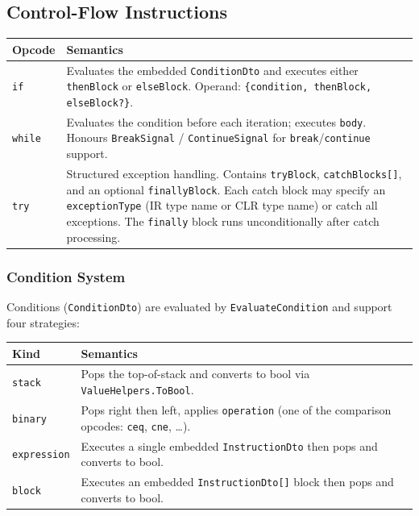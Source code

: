 \documentclass[11pt,a4paper]{article}
\newcommand{\code}[1]{\texttt{\small #1}}
\newcommand{\typename}[1]{\textcolor{typecolor}{\texttt{\small #1}}}
\begin{document}
\subsection{Control-Flow Instructions}

\begin{longtable}{lp{10cm}}
  \toprule
  \textbf{Opcode} & \textbf{Semantics} \\
  \midrule
  \endhead
  \code{if}    & Evaluates the embedded \typename{ConditionDto} and executes either
                 \code{thenBlock} or \code{elseBlock}. Operand:
                 \code{\{condition, thenBlock, elseBlock?\}}. \\
  \code{while} & Evaluates the condition before each iteration; executes \code{body}.
                 Honours \typename{BreakSignal} / \typename{ContinueSignal} for
                 \code{break}/\code{continue} support. \\
  \code{try}   & Structured exception handling. Contains \code{tryBlock},
                 \code{catchBlocks[]}, and an optional \code{finallyBlock}. Each
                 catch block may specify an \code{exceptionType} (IR type name or CLR
                 type name) or catch all exceptions. The \code{finally} block runs
                 unconditionally after catch processing. \\
  \bottomrule
\end{longtable}

\subsubsection{Condition System}

Conditions (\typename{ConditionDto}) are evaluated by \code{EvaluateCondition} and
support four strategies:

\begin{longtable}{lp{10cm}}
  \toprule
  \textbf{Kind} & \textbf{Semantics} \\
  \midrule
  \endhead
  \code{stack}      & Pops the top-of-stack and converts to bool via
                      \typename{ValueHelpers}\code{.ToBool}. \\
  \code{binary}     & Pops right then left, applies \code{operation} (one of the
                      comparison opcodes: \code{ceq}, \code{cne}, \ldots). \\
  \code{expression} & Executes a single embedded \typename{InstructionDto} then pops
                      and converts to bool. \\
  \code{block}      & Executes an embedded \typename{InstructionDto}\code{[]} block
                      then pops and converts to bool. \\
  \bottomrule
\end{longtable}
\end{document}
